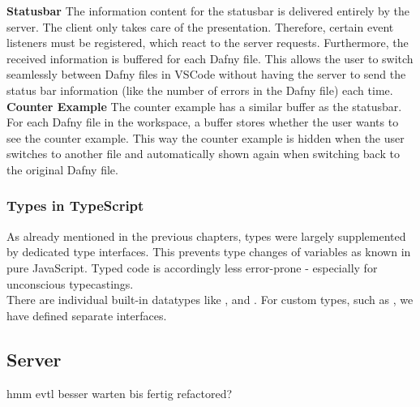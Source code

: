 {\bf Statusbar} \textendash{}
The information content for the statusbar is delivered entirely by the server.
The client only takes care of the presentation.
Therefore, certain event listeners must be registered, which react to the server requests.
Furthermore, the received information is buffered for each Dafny file.
This allows the user to switch seamlessly between Dafny files in VSCode
without having the server to send the status bar information
(like the number of errors in the Dafny file) each time.  \\

{\bf Counter Example} \textendash{}
The counter example has a similar buffer as the statusbar.
For each Dafny file in the workspace, a buffer stores whether the user wants to see the counter example.
This way the counter example is hidden when the user switches to another file
and automatically shown again when switching back to the original Dafny file.

\subsubsection{Types in TypeScript}
As already mentioned in the previous chapters,  types were largely supplemented by dedicated type interfaces. This prevents type changes of variables as known in pure JavaScript. Typed code is accordingly less error-prone - especially for unconscious typecastings. \\

There are individual built-in datatypes like ,  and  \cite{ts-types}.
For custom types, such as , we have defined separate interfaces.




\subsection{Server}
hmm evtl besser warten bis fertig refactored?

